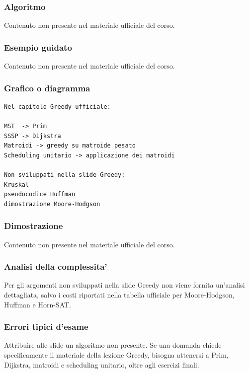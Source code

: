 \subsubsection{Algoritmo}
\begin{hardnote}
Contenuto non presente nel materiale ufficiale del corso.
\end{hardnote}

\subsubsection{Esempio guidato}
\begin{hardnote}
Contenuto non presente nel materiale ufficiale del corso.
\end{hardnote}

\subsubsection{Grafico o diagramma}
\begin{center}
\begin{verbatim}
Nel capitolo Greedy ufficiale:

MST  -> Prim
SSSP -> Dijkstra
Matroidi -> greedy su matroide pesato
Scheduling unitario -> applicazione dei matroidi

Non sviluppati nella slide Greedy:
Kruskal
pseudocodice Huffman
dimostrazione Moore-Hodgson
\end{verbatim}
\end{center}

\subsubsection{Dimostrazione}
\begin{hardnote}
Contenuto non presente nel materiale ufficiale del corso.
\end{hardnote}

\subsubsection{Analisi della complessita'}
Per gli argomenti non sviluppati nella slide Greedy non viene fornita un'analisi dettagliata, salvo i costi riportati nella tabella ufficiale per Moore-Hodgson, Huffman e Horn-SAT.

\subsubsection{Errori tipici d'esame}
\begin{hardnote}
Attribuire alle slide un algoritmo non presente. Se una domanda chiede specificamente il materiale della lezione Greedy, bisogna attenersi a Prim, Dijkstra, matroidi e scheduling unitario, oltre agli esercizi finali.
\end{hardnote}

